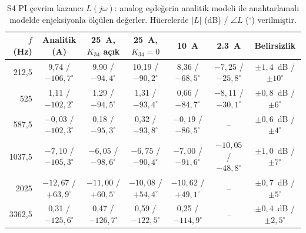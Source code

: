 \begin{table}[H]
  \centering
  \caption{S4 PI çevrim kazancı $L(j\omega)$: analog eşdeğerin analitik modeli ile anahtarlamalı modelde enjeksiyonla ölçülen değerler. Hücrelerde $|L|$ (dB) / $\angle L$ ($^{\circ}$) verilmiştir.}
  \label{tab:kararlilik-olcum}
  \scriptsize
  \setlength{\tabcolsep}{3pt}
  \begin{tabular}{@{}r c c c c c c@{}}
    \toprule
    $f$ (Hz) & Analitik (A) & \SI{25}{\ampere}, $K_{34}$ açık & \SI{25}{\ampere}, $K_{34}=0$ & \SI{10}{\ampere} & \SI{2.3}{\ampere} & Belirsizlik \\
    \midrule
    212,5  & 9,74 / $-106{,}7^{\circ}$ & 9,90 / $-94{,}4^{\circ}$ & 10,19 / $-90{,}2^{\circ}$ & 8,36 / $-68{,}5^{\circ}$ & $-7{,}25$ / $-25{,}8^{\circ}$ & $\pm1{,}4$~dB / $\pm10^{\circ}$ \\
    525    & 1,11 / $-102{,}2^{\circ}$ & 1,29 / $-94{,}5^{\circ}$ & 1,31 / $-93{,}4^{\circ}$ & 0,66 / $-84{,}7^{\circ}$ & $-8{,}11$ / $-30{,}1^{\circ}$ & $\pm0{,}8$~dB / $\pm6^{\circ}$ \\
    587,5  & $-0{,}03$ / $-102{,}3^{\circ}$ & 0,18 / $-95{,}3^{\circ}$ & 0,32 / $-93{,}8^{\circ}$ & $-0{,}19$ / $-86{,}5^{\circ}$ & -- & $\pm0{,}6$~dB / $\pm4^{\circ}$ \\
    1037,5 & $-7{,}10$ / $-105{,}3^{\circ}$ & $-6{,}05$ / $-98{,}6^{\circ}$ & $-6{,}75$ / $-90{,}4^{\circ}$ & $-7{,}00$ / $-91{,}6^{\circ}$ & $-10{,}05$ / $-48{,}8^{\circ}$ & $\pm1{,}0$~dB / $\pm7^{\circ}$ \\
    2025   & $-12{,}67$ / $+63{,}9^{\circ}$ & $-11{,}00$ / $+60{,}5^{\circ}$ & $-10{,}08$ / $+54{,}4^{\circ}$ & $-10{,}62$ / $+49{,}1^{\circ}$ & -- & $\pm0{,}7$~dB / $\pm5^{\circ}$ \\
    3362,5 & 0,31 / $-125{,}6^{\circ}$ & 0,47 / $-126{,}7^{\circ}$ & 0,59 / $-122{,}5^{\circ}$ & 0,25 / $-114{,}9^{\circ}$ & -- & $\pm0{,}4$~dB / $\pm2{,}5^{\circ}$ \\
    \bottomrule
  \end{tabular}
\end{table}


